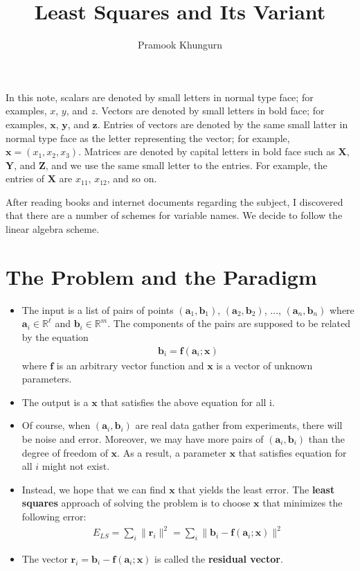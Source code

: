 \documentclass[10pt]{article}
\title{Least Squares and Its Variant}
\author{Pramook Khungurn}
\newcommand{\ve}[1]{\mathbf{#1}}
\begin{document}
	\maketitle
	
	In this note, scalars are denoted by small letters in
	normal type face; for examples, $x$, $y$, and $z$. 
	Vectors are denoted by small letters in bold face;
	for examples, $\ve{x}$, $\ve{y}$, and $\ve{z}$. Entries of vectors
	are denoted by the same small latter in normal type face as the 
	letter representing the vector; for example, $\ve{x} = (x_1, x_2, x_3)$.
	Matrices are denoted by capital letters in bold face such
	as $\ve{X}$, $\ve{Y}$, and $\ve{Z}$, and we use the same small letter to the
	entries. For example, the entries of $\ve{X}$ are $x_{11}$, $x_{12}$,
	and so on.
	
	After reading books and internet documents regarding the subject,
	I discovered that there are a number of schemes for variable names.
	We decide to follow the linear algebra scheme.
	
	\section{The Problem and the Paradigm} %
	
	\begin{itemize}
	  \item The input is a list of pairs of points 
	    $(\ve{a}_1, \ve{b}_1)$, $(\ve{a}_2, \ve{b}_2)$, 
	    $\dotsc$, $(\ve{a}_n, \ve{b}_n)$ where $\ve{a}_i \in \mathbb{R}^\ell$ 
	    and $\ve{b}_i \in \mathbb{R}^m$.
	    The components of the pairs are supposed to be related by the equation
	    \begin{align*}
	      \ve{b}_i = \ve{f}(\ve{a}_i; \ve{x})
	    \end{align*}
	    where $\ve{f}$ is an arbitrary vector function and $\ve{x}$ is 
	    a vector of unknown parameters.
	    
	  \item The output is a $\ve{x}$ that satisfies the above equation
	    for all i.	  
	    
	  \item Of course, when $(\ve{a}_i, \ve{b}_i)$ are real data 
	    gather from experiments, there will be noise and error. Moreover,
	    we may have more pairs of $(\ve{a}_i, \ve{b}_i)$ than
	    the degree of freedom of $\ve{x}$. As a result, a parameter $\ve{x}$ 
	    that satisfies equation for all $i$ might not exist.
	    
	  \item Instead, we hope that we can find $\ve{x}$ that 
	    yields the least error. The {\bf least squares} approach 
	    of solving the problem is to choose $\ve{x}$ that 
	    minimizes the following error:
	    \begin{align*}
	      E_{LS} = \sum_{i} \| \ve{r}_i \|^2 = \sum_{i} \| \ve{b}_i - \ve{f}(\ve{a}_i; \ve{x}) \|^2
	    \end{align*}
	  \item The vector $\ve{r}_i =  \ve{b}_i - \ve{f}(\ve{a}_i; \ve{x})$ 
	    is called the {\bf residual vector}.
  \end{itemize}
  
\end{document}
